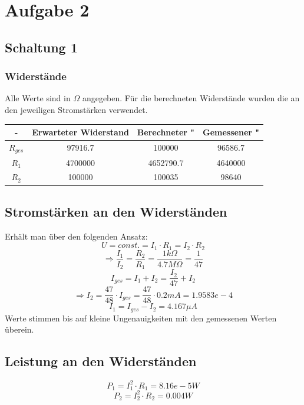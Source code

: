 \documentclass[compress,11pt]{beamer}
\begin{document}
\section{Aufgabe 2}
\begin{frame}
\subsection{Schaltung 1}
\subsubsection{Widerstände}

Alle Werte sind in $\Omega$ angegeben. Für die berechneten Widerstände wurden die an den jeweiligen Stromstärken verwendet.\\
\begin{tabular}{|c|c|c|c|}
\hline 
- & Erwarteter Widerstand & Berechneter " & Gemessener " \\ 
\hline 
$R_{ges}$  & 97916.7 & 100000 & 96586.7 \\ 
\hline 
$R_1$ & 4700000 & 4652790.7 & 4640000 \\ 
\hline
$R_2$ & 100000 & 100035 & 98640 \\
\hline
\end{tabular}

\subsection{Stromstärken an den Widerständen}
Erhält man über den folgenden Ansatz:
\begin{equation}
U = const. = I_1 \cdot R_1 = I_2 \cdot R_2
\end{equation}
\begin{equation}
\Rightarrow \frac{I_1}{I_2} = \frac{R_2}{R_1} = \frac{1 k\Omega}{4.7 M\Omega} = \frac{1}{47}
\end{equation}
\begin{equation}
I_{ges} = I_1 + I_2 = \frac{I_2}{47} + I_2
\end{equation}
\begin{equation}
\Rightarrow I_2 = \frac{47}{48} \cdot I_{ges} = \frac{47}{48} \cdot 0.2 mA = 1.9583 e-4
\end{equation}
\begin{equation}
I_1 = I_{ges} - I_2 = 4.167 \mu A
\end{equation}
Werte stimmen bis auf kleine Ungenauigkeiten mit den gemessenen Werten überein.
\subsection{Leistung an den Widerständen}
\begin{equation}
P_1 = I_1^2 \cdot R_1 = 8.16 e-5 W
\end{equation}
\begin{equation}
P_2 = I_2^2 \cdot R_2 = 0.004 W
\end{equation}
\end{frame}
\end{document}
